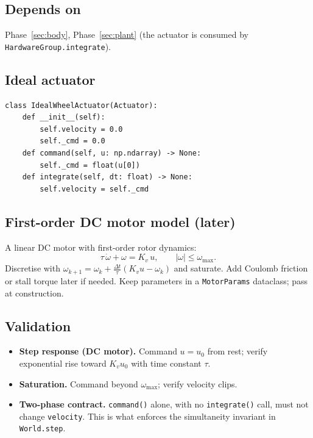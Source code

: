 \documentclass[11pt,a4paper]{article}
\newcommand{\code}[1]{\texttt{\small #1}}
\begin{document}
\subsection*{Depends on}
Phase~\ref{sec:body}, Phase~\ref{sec:plant} (the actuator is consumed by
\code{HardwareGroup.integrate}).

\subsection*{Ideal actuator}

\begin{lstlisting}
class IdealWheelActuator(Actuator):
    def __init__(self):
        self.velocity = 0.0
        self._cmd = 0.0
    def command(self, u: np.ndarray) -> None:
        self._cmd = float(u[0])
    def integrate(self, dt: float) -> None:
        self.velocity = self._cmd
\end{lstlisting}

\subsection*{First-order DC motor model (later)}

A linear DC motor with first-order rotor dynamics:
\begin{equation}
    \tau\, \dot\omega + \omega = K_v\, u, \qquad |\omega| \le \omega_{\max}.
\end{equation}
Discretise with $\omega_{k+1} = \omega_k + \frac{\Delta t}{\tau}(K_v u - \omega_k)$
and saturate. Add Coulomb friction or stall torque later if needed. Keep
parameters in a \code{MotorParams} dataclass; pass at construction.

\subsection*{Validation}

\begin{itemize}
    \item \textbf{Step response (DC motor).} Command $u = u_0$ from
        rest; verify exponential rise toward $K_v u_0$ with time constant
        $\tau$.
    \item \textbf{Saturation.} Command beyond $\omega_{\max}$; verify
        velocity clips.
    \item \textbf{Two-phase contract.} \code{command()} alone, with no
        \code{integrate()} call, must not change \code{velocity}. This is
        what enforces the simultaneity invariant in \code{World.step}.
\end{itemize}
\end{document}
